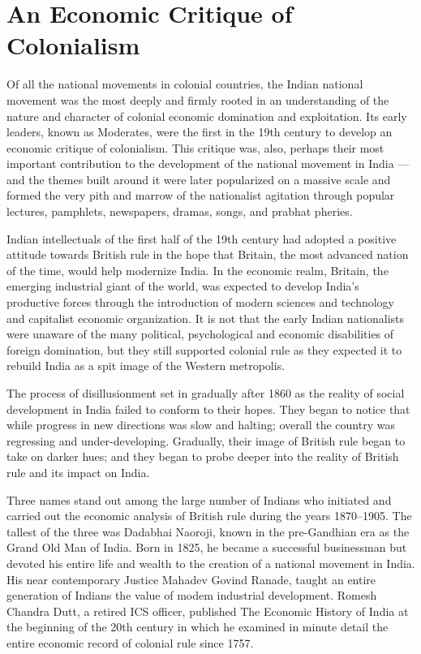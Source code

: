 \chapter{An Economic Critique of Colonialism}

Of all the national movements in colonial countries, the Indian national movement was the most deeply and firmly rooted in an understanding of the nature and character of colonial economic domination and exploitation. Its early leaders, known as Moderates, were the first in the 19th century to develop an economic critique of colonialism. This critique was, also, perhaps their most important contribution to the development of the national movement in India --- and the themes built around it were later popularized on a massive scale and formed the very pith and marrow of the nationalist agitation through popular lectures, pamphlets, newspapers, dramas, songs, and prabhat pheries.

Indian intellectuals of the first half of the 19th century had adopted a positive attitude towards British rule in the hope that Britain, the most advanced nation of the time, would help modernize India. In the economic realm, Britain, the emerging industrial giant of the world, was expected to develop India's productive forces through the introduction of modern sciences and technology and capitalist economic organization. It is not that the early Indian nationalists were unaware of the many political, psychological and economic disabilities of foreign domination, but they still supported colonial rule as they expected it to rebuild India as a spit image of the Western metropolis.

The process of disillusionment set in gradually after 1860 as the reality of social development in India failed to conform to their hopes. They began to notice that while progress in new directions was slow and halting; overall the country was regressing and under-developing. Gradually, their image of British rule began to take on darker hues; and they began to probe deeper into the reality of British rule and its impact on India.

Three names stand out among the large number of Indians who initiated and carried out the economic analysis of British rule during the years 1870--1905. The tallest of the three was Dadabhai Naoroji, known in the pre-Gandhian era as the Grand Old Man of India. Born in 1825, he became a successful businessman but devoted his entire life and wealth to the creation of a national movement in India. His near contemporary Justice Mahadev Govind Ranade, taught an entire generation of Indians the value of modem industrial development. Romesh Chandra Dutt, a retired ICS officer, published The Economic History of India at the beginning of the 20th century in which he examined in minute detail the entire economic record of colonial rule since 1757.


